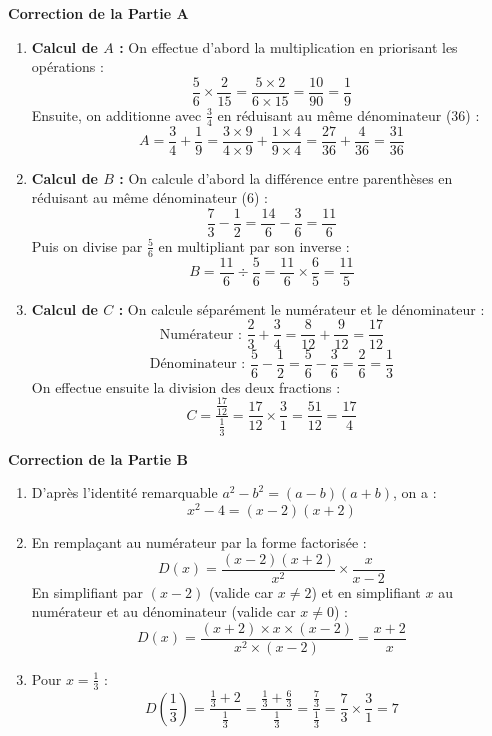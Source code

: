 \documentclass[11pt,a4paper]{article}
\newcommand{\partie}[1]{%
  \vspace{0.9em}%
  \noindent\textbf{#1}%
  \par\vspace{0.3em}%
}
\begin{document}
\partie{Correction de la Partie A}
\begin{enumerate}
  \item \textbf{Calcul de $A$ :}
  On effectue d'abord la multiplication en priorisant les opérations :
  $$\frac{5}{6} \times \frac{2}{15} = \frac{5 \times 2}{6 \times 15} = \frac{10}{90} = \frac{1}{9}$$
  Ensuite, on additionne avec $\frac{3}{4}$ en réduisant au même dénominateur ($36$) :
  $$A = \frac{3}{4} + \frac{1}{9} = \frac{3 \times 9}{4 \times 9} + \frac{1 \times 4}{9 \times 4} = \frac{27}{36} + \frac{4}{36} = \frac{31}{36}$$

  \item \textbf{Calcul de $B$ :}
  On calcule d'abord la différence entre parenthèses en réduisant au même dénominateur ($6$) :
  $$\frac{7}{3} - \frac{1}{2} = \frac{14}{6} - \frac{3}{6} = \frac{11}{6}$$
  Puis on divise par $\frac{5}{6}$ en multipliant par son inverse :
  $$B = \frac{11}{6} \div \frac{5}{6} = \frac{11}{6} \times \frac{6}{5} = \frac{11}{5}$$

  \item \textbf{Calcul de $C$ :}
  On calcule séparément le numérateur et le dénominateur :
  $$\text{Numérateur : } \frac{2}{3} + \frac{3}{4} = \frac{8}{12} + \frac{9}{12} = \frac{17}{12}$$
  $$\text{Dénominateur : } \frac{5}{6} - \frac{1}{2} = \frac{5}{6} - \frac{3}{6} = \frac{2}{6} = \frac{1}{3}$$
  On effectue ensuite la division des deux fractions :
  $$C = \frac{\frac{17}{12}}{\frac{1}{3}} = \frac{17}{12} \times \frac{3}{1} = \frac{51}{12} = \frac{17}{4}$$
\end{enumerate}

\partie{Correction de la Partie B}
\begin{enumerate}
  \item D'après l'identité remarquable $a^2 - b^2 = (a-b)(a+b)$, on a :
  $$x^2 - 4 = (x - 2)(x + 2)$$

  \item En remplaçant au numérateur par la forme factorisée :
  $$D(x) = \frac{(x - 2)(x + 2)}{x^2} \times \frac{x}{x - 2}$$
  En simplifiant par $(x - 2)$ (valide car $x \neq 2$) et en simplifiant $x$ au numérateur et au dénominateur (valide car $x \neq 0$) :
  $$D(x) = \frac{(x + 2) \times x \times (x - 2)}{x^2 \times (x - 2)} = \frac{x + 2}{x}$$

  \item Pour $x = \frac{1}{3}$ :
  $$D\left(\frac{1}{3}\right) = \frac{\frac{1}{3} + 2}{\frac{1}{3}} = \frac{\frac{1}{3} + \frac{6}{3}}{\frac{1}{3}} = \frac{\frac{7}{3}}{\frac{1}{3}} = \frac{7}{3} \times \frac{3}{1} = 7$$
\end{enumerate}
\end{document}
